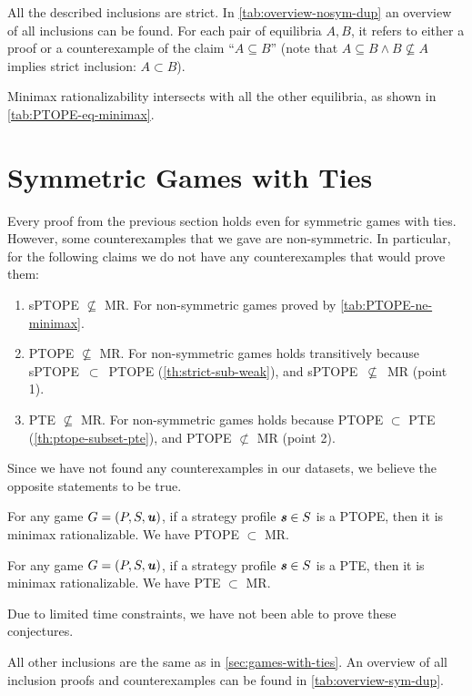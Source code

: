 All the described inclusions are strict.
In \autoref{tab:overview-nosym-dup} an overview of all inclusions can be found.
For each pair of equilibria $A, B$, it refers to either a proof or a counterexample of the claim \enquote{$A \subseteq B$} (note that $A \subseteq B \land B \not\subseteq A$ implies strict inclusion: $A \subset B$).

Minimax rationalizability intersects with all the other equilibria, as shown in \autoref{tab:PTOPE-eq-minimax}.


\section{Symmetric Games with Ties}
Every proof from the previous section holds even for symmetric games with ties.
However, some counterexamples that we gave are non-symmetric.
In particular, for the following claims we do not have any counterexamples that would prove them:
\begin{enumerate}
	\item sPTOPE $\not\subseteq$ MR. For non-symmetric games proved by \autoref{tab:PTOPE-ne-minimax}.
	\item PTOPE $\not\subseteq$ MR. For non-symmetric games holds transitively because sPTOPE~$\subset$~PTOPE (\autoref{th:strict-sub-weak}), and sPTOPE~$\not\subseteq$~MR (point 1).
	\item PTE $\not\subseteq$ MR. For non-symmetric games holds because PTOPE $\subset$ PTE (\autoref{th:ptope-subset-pte}), and PTOPE $\not\subset$ MR (point 2).
\end{enumerate}
Since we have not found any counterexamples in our datasets, we believe the opposite statements to be true.

\begin{conjecture}
	For any game $G = (P, S, \boldsymbol{\mathit{u}})$, if a strategy profile $\boldsymbol{\mathit{s}} \in S$ is a PTOPE, then it is minimax rationalizable.
	We have PTOPE $\subset$ MR.
\end{conjecture}

\begin{conjecture}
	For any game $G = (P, S, \boldsymbol{\mathit{u}})$, if a strategy profile $\boldsymbol{\mathit{s}} \in S$ is a PTE, then it is minimax rationalizable.
	We have PTE $\subset$ MR.
\end{conjecture}

Due to limited time constraints, we have not been able to prove these conjectures.

All other inclusions are the same as in \autoref{sec:games-with-ties}.
An overview of all inclusion proofs and counterexamples can be found in \autoref{tab:overview-sym-dup}.

